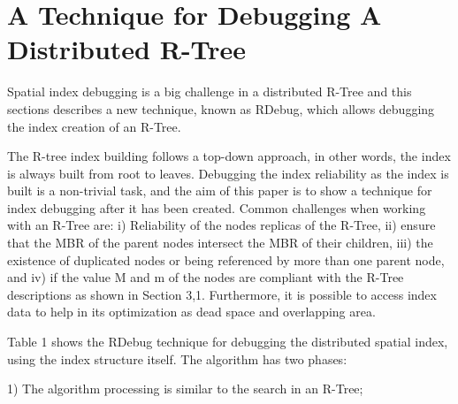 \section{A Technique for Debugging A Distributed R-Tree}

	Spatial index debugging is a big challenge in a distributed R-Tree and this sections describes a new technique, known as RDebug, which allows debugging the index creation of an R-Tree.
	
	The R-tree index building follows a top-down approach, in other words, the index is always built from root to leaves. Debugging the index reliability as the index is built is a non-trivial task, and the aim of this paper is to show a technique for index debugging after it has been created. Common challenges when working with an R-Tree are: i) Reliability of the nodes replicas of the R-Tree, ii) ensure that the MBR of the parent nodes intersect the MBR of their children, iii) the existence of duplicated nodes or being referenced by more than one parent node, and iv) if the value M and m of the nodes are compliant with the R-Tree descriptions as shown in Section 3,1. Furthermore, it is possible to access index data to help in its optimization as dead space and overlapping area.

	Table 1 shows the RDebug technique for debugging the distributed spatial index, using the index structure itself. The algorithm has two phases:

1) The algorithm processing is similar to the search in an R-Tree;

